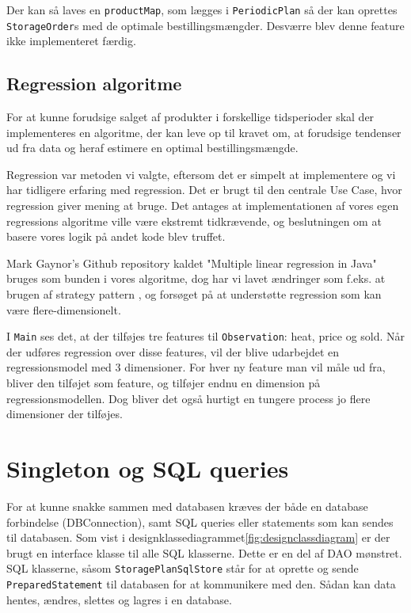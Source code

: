 Der kan så laves en \verb|productMap|, som lægges i \verb|PeriodicPlan| så der kan oprettes \verb|StorageOrder|s med de optimale bestillingsmængder. Desværre blev denne feature ikke implementeret færdig.

\subsection{Regression algoritme}
For at kunne forudsige salget af produkter i forskellige tidsperioder skal der implementeres en algoritme, der kan leve op til kravet om, at forudsige tendenser ud fra data og heraf estimere en optimal bestillingsmængde.

Regression var metoden vi valgte, eftersom det er simpelt at implementere og vi har tidligere erfaring med regression. Det er brugt til den centrale Use Case, hvor regression giver mening at bruge. Det antages at implementationen af vores egen regressions algoritme ville være ekstremt tidkrævende, og beslutningen om at basere vores logik på andet kode blev truffet.

Mark Gaynor's Github repository kaldet "Multiple linear regression in Java" \cite{MarkGaynorRegressin} bruges som bunden i vores algoritme, dog har vi lavet ændringer som f.eks. at brugen af strategy pattern \cite{Larman2004}, og forsøget på at understøtte regression som kan være flere-dimensionelt. 

I \texttt{Main} ses det, at der tilføjes tre features til \texttt{Observation}: heat, price og sold. Når der udføres regression over disse features, vil der blive udarbejdet en regressionsmodel med 3 dimensioner. For hver ny feature man vil måle ud fra, bliver den tilføjet som feature, og tilføjer endnu en dimension på regressionsmodellen. Dog bliver det også hurtigt en tungere process jo flere dimensioner der tilføjes. 

\section{Singleton og SQL queries}
For at kunne snakke sammen med databasen kræves der både en database forbindelse (DBConnection), samt SQL queries eller statements som kan sendes til databasen. Som vist i designklassediagrammet\ref{fig:designclassdiagram} er der brugt en interface klasse til alle SQL klasserne. Dette er en del af DAO mønstret\cite{DAO}. SQL klasserne, såsom \texttt{StoragePlanSqlStore} står for at oprette og sende \texttt{PreparedStatement} til databasen for at kommunikere med den. Sådan kan data hentes, ændres, slettes og lagres i en database. 

